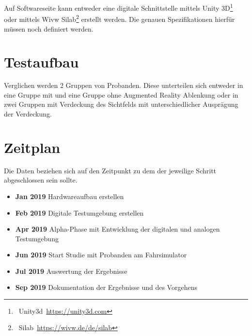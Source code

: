 \documentclass[a4paper, 11pt]{article}
\begin{document}
Auf Softwareseite kann entweder eine digitale Schnittstelle mittels Unity 3D\footnote{~Unity3d~\url{https://unity3d.com}} oder mittels Wivw Silab\footnote{~Silab~\url{https://wivw.de/de/silab}} erstellt werden. Die genauen Spezifikationen hierfür müssen noch definiert werden.

\section*{Testaufbau}
Verglichen werden 2 Gruppen von Probanden. Diese unterteilen sich entweder in eine Gruppe mit und eine Gruppe ohne Augmented Reality Ablenkung oder in zwei Gruppen mit Verdeckung des Sichtfelds mit unterschiedlicher Ausprägung der Verdeckung.

\section*{Zeitplan}
Die Daten beziehen sich auf den Zeitpunkt zu dem der jeweilige Schritt abgeschlossen sein sollte.
\begin{itemize}
    \item \textbf{Jan 2019} Hardwareaufbau erstellen
    \item \textbf{Feb 2019} Digitale Testumgebung erstellen
    \item \textbf{Apr 2019} Alpha-Phase mit Entwicklung der digitalen und analogen Testumgebung
    \item \textbf{Jun 2019} Start Studie mit Probanden am Fahrsimulator
    \item \textbf{Jul 2019} Auswertung der Ergebnisse
    \item \textbf{Sep 2019} Dokumentation der Ergebnisse und des Vorgehens
\end{itemize}
\end{document}
